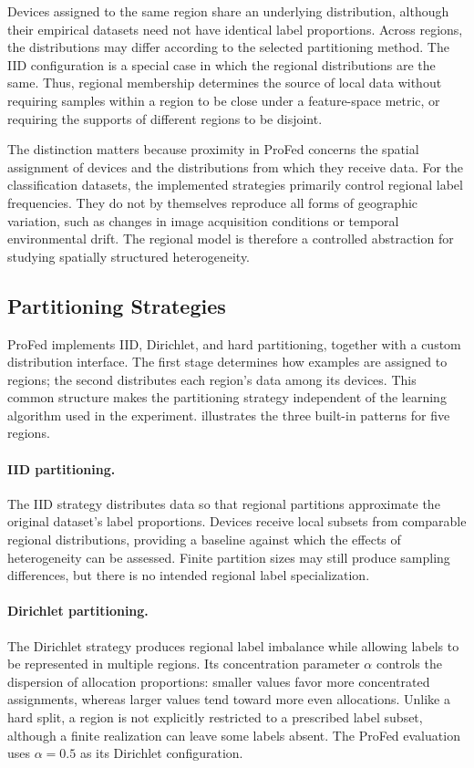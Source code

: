 Devices assigned to the same region share an underlying distribution,
 although their empirical datasets need not have identical label proportions.
%
Across regions, the distributions may differ according to the selected
 partitioning method.
%
The IID configuration is a special case in which the regional distributions
 are the same.
%
Thus, regional membership determines the source of local data without
 requiring samples within a region to be close under a feature-space metric,
 or requiring the supports of different regions to be disjoint.

The distinction matters because proximity in ProFed concerns the spatial
 assignment of devices and the distributions from which they receive data.
%
For the classification datasets, the implemented strategies primarily
 control regional label frequencies.
%
They do not by themselves reproduce all forms of geographic variation,
 such as changes in image acquisition conditions or temporal environmental drift.
%
The regional model is therefore a controlled abstraction for studying
 spatially structured heterogeneity.

\subsection{Partitioning Strategies}
\label{sec:profed-partitioning}

ProFed implements IID, Dirichlet, and hard partitioning, together with a
 custom distribution interface.
%
The first stage determines how examples are assigned to regions; the second
 distributes each region's data among its devices.
%
This common structure makes the partitioning strategy independent of the
 learning algorithm used in the experiment.
%
 illustrates the three built-in patterns for five regions.

\paragraph{IID partitioning.}
The IID strategy distributes data so that regional partitions approximate
 the original dataset's label proportions.
%
Devices receive local subsets from comparable regional distributions,
 providing a baseline against which the effects of heterogeneity can be assessed.
%
Finite partition sizes may still produce sampling differences, but there is
 no intended regional label specialization.

\paragraph{Dirichlet partitioning.}
The Dirichlet strategy produces regional label imbalance while allowing
 labels to be represented in multiple regions.
%
Its concentration parameter $\alpha$ controls the dispersion of allocation
 proportions: smaller values favor more concentrated assignments, whereas
 larger values tend toward more even allocations.
%
Unlike a hard split, a region is not explicitly restricted to a prescribed
 label subset, although a finite realization can leave some labels absent.
%
The ProFed evaluation uses $\alpha=0.5$ as its Dirichlet configuration.

